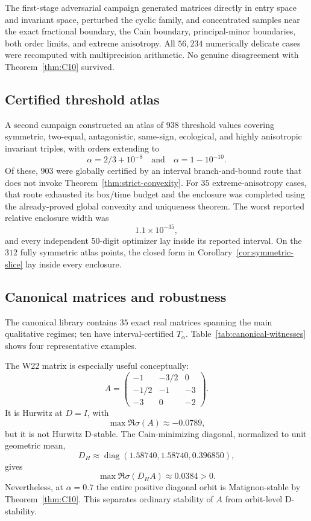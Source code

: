 The first-stage adversarial campaign generated matrices directly in entry space and invariant space, perturbed the cyclic family, and concentrated samples near the exact fractional boundary, the Cain boundary, principal-minor boundaries, both order limits, and extreme anisotropy. All \(56{,}234\) numerically delicate cases were recomputed with multiprecision arithmetic. No genuine disagreement with Theorem~\ref{thm:C10} survived.

\subsection{Certified threshold atlas}

A second campaign constructed an atlas of \(938\) threshold values covering symmetric, two-equal, antagonistic, same-sign, ecological, and highly anisotropic invariant triples, with orders extending to
\[
\alpha=2/3+10^{-8}
\quad\text{and}\quad
\alpha=1-10^{-10}.
\]
Of these, \(903\) were globally certified by an interval branch-and-bound route that does not invoke Theorem~\ref{thm:strict-convexity}. For \(35\) extreme-anisotropy cases, that route exhausted its box/time budget and the enclosure was completed using the already-proved global convexity and uniqueness theorem. The worst reported relative enclosure width was
\[
1.1\times10^{-35},
\]
and every independent 50-digit optimizer lay inside its reported interval. On the \(312\) fully symmetric atlas points, the closed form in Corollary~\ref{cor:symmetric-slice} lay inside every enclosure.

\subsection{Canonical matrices and robustness}

The canonical library contains \(35\) exact real matrices spanning the main qualitative regimes; ten have interval-certified \(T_\alpha\). Table~\ref{tab:canonical-witnesses} shows four representative examples.



The W22 matrix is especially useful conceptually:
\[
A=
\begin{pmatrix}
-1&-3/2&0\\
-1/2&-1&-3\\
-3&0&-2
\end{pmatrix}.
\]
It is Hurwitz at \(D=I\), with
\[
\max\Re\sigma(A)\approx-0.0789,
\]
but it is not Hurwitz D-stable. The Cain-minimizing diagonal, normalized to unit geometric mean,
\[
D_H\approx
\operatorname{diag}(1.58740,1.58740,0.396850),
\]
gives
\[
\max\Re\sigma(D_HA)\approx0.0384>0.
\]
Nevertheless, at \(\alpha=0.7\) the entire positive diagonal orbit is Matignon-stable by Theorem~\ref{thm:C10}. This separates ordinary stability of \(A\) from orbit-level D-stability.

